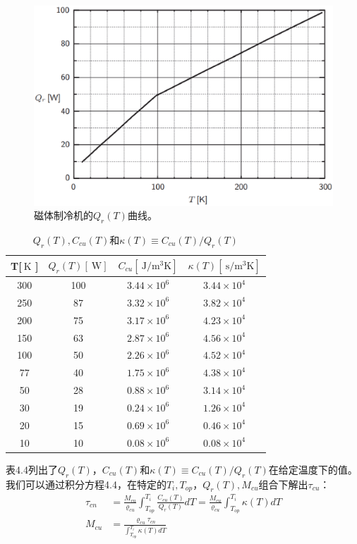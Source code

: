 \begin{figure}[htbp]
	\centering
	\includegraphics[scale=0.5]{chpt4/figs/fig4.7.eps}
	\caption{磁体制冷机的$Q_r(T)$曲线。}
\end{figure}

\begin{table}[htbp]\small
 \centering
\caption{$Q_r(T),C_{cu}(T)$和$\kappa(T)\equiv C_{cu}(T)/Q_r(T)$}
\begin{tabular}{|c|c|c|c|}
\hline
T[$\ \mathrm{K}$ ]  & ${Q_r(T)[\ \mathrm{W}]}$  & $C_{cu}[\ \mathrm{J/m^3K}]$    & $\kappa(T)[\ \mathrm{s/m^3K}]$   \\ \hline\hline
300 & 100 & $3.44\times10^6$ & $3.44\times10^4$ \\
250 & 87 & $3.32\times10^6$ & $3.82\times10^4$\\
200 & 75 & $3.17\times10^6$ & $4.23\times10^4$ \\
150 & 63 & $2.87\times10^6$ & $4.56\times10^4$ \\
100 & 50 & $2.26\times10^6$ & $4.52\times10^4$ \\
77 & 40 & $1.75\times10^6$ & $4.38\times10^4$ \\
50 & 28 & $0.88\times10^6$ & $3.14\times10^4$ \\
30 & 19 & $0.24\times10^6$ & $1.26\times10^4$ \\
20 & 15 & $0.69\times10^6$ & $0.46\times10^4$ \\
10 & \multicolumn{1}{c|}{10} & $0.08\times10^6$ & $0.08\times10^4$ \\ \hline
\end{tabular}
\end{table}

表4.4列出了$Q_r(T)$，$C_{cu}(T)$和$\kappa(T)\equiv C_{cu}(T)/Q_{r}(T)$在给定温度下的值。
我们可以通过积分方程4.4，在特定的$T_i,T_{op}，Q_r(T),M_{cu}$组合下解出$\tau_{cu}$：	
\begin{subequations}%
\begin{align}
\tau_{cn}&=\frac{M_{cu}}{\varrho_{cu}}\int_{T_{op}}^{T_i}\frac{C_{cu}(T)}{Q_r(T)}dT=\frac{M_{cu}}{\varrho_{cu}}\int_{T_{op}}^{T_i}\kappa(T)dT\\
M_{cu}&=\frac{\varrho_{cu}\tau_{cn}}{\int_{T_{op}}^{T_i}\kappa(T)dT}
\end{align}
\end{subequations}

